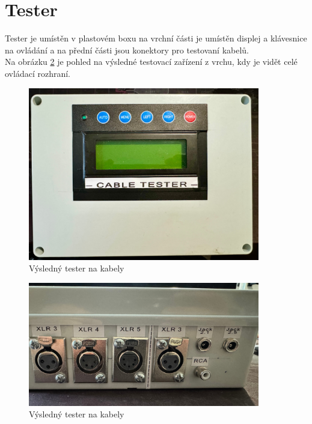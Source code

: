 
\section{Tester}
Tester je umístěn v plastovém boxu na vrchní části je umístěn displej a klávesnice na ovládání a na přední části jsou konektory pro testovaní kabelů.\\

Na obrázku \ref{fig:tester}  je pohled na výsledné testovací zařízení z vrchu, kdy je vidět celé ovládací rozhraní.

\begin{figure}[H]
	\centering
	\includegraphics[width=0.9\textwidth]{pictures/tester-top.jpeg}
    	\caption{Výsledný tester na kabely}
   	\label{fig:tester}
\end{figure}

\begin{figure}[H]
	\centering
	\includegraphics[width=0.9\textwidth]{pictures/tester-io.jpeg}
    	\caption{Výsledný tester na kabely}
   	\label{fig:tester}
\end{figure}

